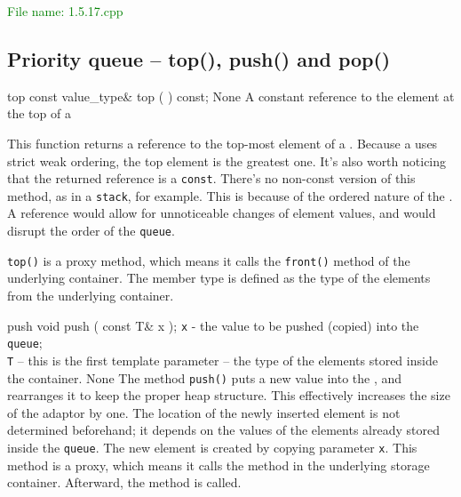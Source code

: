 \textcolor{green}{File name: 1.5.17.cpp}


\subsection{Priority queue – top(), push() and pop()} %
\begin{methodinfo}
  {top}
  {const value_type& top ( ) const;}
  {None}
  {A constant reference to the element at the top of a }
  {This function returns a reference to the top-most element of a . 
  Because a  uses strict weak ordering, the top element is the greatest one. 
  It’s also worth noticing that the returned reference is a \texttt{const}. There’s no non-const version of 
  this method, as in a \texttt{stack}, for example. This is because of the ordered nature of the 
  . A reference would allow for unnoticeable changes of element values, 
  and would disrupt the order of the \texttt{queue}.

  \texttt{top()} is a proxy method, which means it calls the \texttt{front()} method of the underlying container. 
  The member type  is defined as the type of the elements from the underlying container.}
\end{methodinfo}
\begin{methodinfo}
  {push}
  {void push ( const T& x );}
  {\texttt{x} - the value to be pushed (copied) into the \texttt{queue};\\
  \texttt{T} – this is the first template parameter – the type of the elements stored inside the container.}
  {None}
  {The method \texttt{push()} puts a new value into the , and rearranges it 
  to keep the proper heap structure. This effectively increases the size of the adaptor by one. The location 
  of the newly inserted element is not determined beforehand; it depends on the values of the elements 
  already stored inside the \texttt{queue}. The new element is created by copying parameter \texttt{x}. 
  This method is a proxy, which means it calls the  method in the underlying 
  storage container. Afterward, the  method is called.}
\end{methodinfo}
